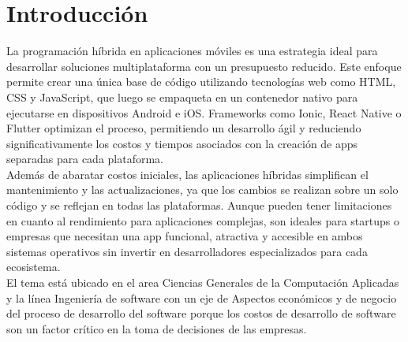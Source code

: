\section{Introducción}

La programación híbrida en aplicaciones móviles es una estrategia ideal para desarrollar
soluciones multiplataforma con un presupuesto reducido. Este enfoque permite crear una
única base de código utilizando tecnologías web como HTML, CSS y JavaScript, que luego
se empaqueta en un contenedor nativo para ejecutarse en dispositivos Android e iOS.
Frameworks como Ionic, React Native o Flutter optimizan el proceso, permitiendo un
desarrollo ágil y reduciendo significativamente los costos y tiempos asociados con la
creación de apps separadas para cada plataforma.\\

Además de abaratar costos iniciales, las aplicaciones híbridas simplifican el mantenimiento
y las actualizaciones, ya que los cambios se realizan sobre un solo código y se reflejan en
todas las plataformas. Aunque pueden tener limitaciones en cuanto al rendimiento para
aplicaciones complejas, son ideales para startups o empresas que necesitan una app
funcional, atractiva y accesible en ambos sistemas operativos sin invertir en desarrolladores
especializados para cada ecosistema.\\

El tema está ubicado en el area 
Ciencias Generales de la Computación Aplicadas y la 
línea Ingeniería de software con un eje de 
Aspectos económicos y de negocio del proceso de desarrollo del software porque los costos
de desarrollo de software son un factor crítico en la toma de decisiones de las empresas.
